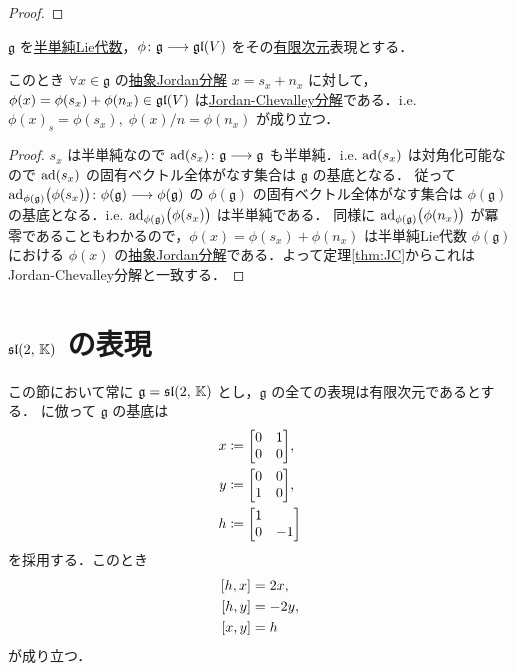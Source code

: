 \documentclass[rep_main]{subfiles}
\begin{document}
\begin{proof}
\end{proof}

\begin{mycol}[label=col:JC]{}
	$\mathfrak{g}$ を\hyperref[def:semisimple-LieAlg]{半単純Lie代数}，$\phi \colon \mathfrak{g} \longrightarrow \mathfrak{gl}(V)$ をその\underline{有限次元}表現とする．

	このとき $\forall x \in \mathfrak{g}$ の\hyperref[def:abstruct-JC]{抽象Jordan分解} $x = s_x + n_x$ に対して，$\phi(x) = \phi(s_x) + \phi(n_x) \in \mathfrak{gl}(V)$ は\hyperref[prop:Jordan-Chevalley]{Jordan-Chevalley分解}である．i.e. $\phi(x)_s = \phi(s_x),\; \phi(x)/n = \phi(n_x)$ が成り立つ．
\end{mycol}

\begin{proof}
	$s_x$ は半単純なので $\operatorname{ad} (s_x) \colon \mathfrak{g} \longrightarrow \mathfrak{g}$ も半単純．i.e. $\operatorname{ad}(s_x)$ は対角化可能なので $\operatorname{ad}(s_x)$ の固有ベクトル全体がなす集合は $\mathfrak{g}$ の基底となる．
	従って $\operatorname{ad}_{\phi(\mathfrak{g})} \bigl( \phi(s_x) \bigr) \colon \phi(\mathfrak{g}) \longrightarrow \phi(\mathfrak{g})$ の $\phi(\mathfrak{g})$ の固有ベクトル全体がなす集合は $\phi(\mathfrak{g})$ の基底となる．i.e. $\operatorname{ad}_{\phi(\mathfrak{g})} \bigl( \phi(s_x) \bigr)$ は半単純である．
	同様に $\operatorname{ad}_{\phi(\mathfrak{g})} \bigl( \phi(n_x) \bigr)$ が冪零であることもわかるので，$\phi(x) = \phi(s_x) + \phi(n_x)$ は半単純Lie代数 $\phi(\mathfrak{g})$ における $\phi(x)$ の\hyperref[def:abstruct-JC]{抽象Jordan分解}である．よって定理\ref{thm:JC}からこれはJordan-Chevalley分解と一致する．
\end{proof}


\section{$\mathfrak{sl}(2,\, \mathbb{K})$ の表現}

この節において常に $\mathfrak{g} = \mathfrak{sl}(2,\, \mathbb{K})$ とし，$\mathfrak{g}$ の全ての表現は有限次元であるとする．
に倣って $\mathfrak{g}$ の基底は
\begin{align}
	x &\coloneqq \mqty[0 & 1 \\ 0 & 0], \\
	y &\coloneqq \mqty[0 & 0 \\ 1 & 0], \\
	h &\coloneqq \mqty[1 &  \\ 0 & -1]
\end{align}
を採用する．このとき
\begin{align}
	\label{eq:sl2}
	\comm{h}{x} &= 2x, \\
	\comm{h}{y} &= -2y, \\
	\comm{x}{y} &= h
\end{align}
が成り立つ．
\end{document}

